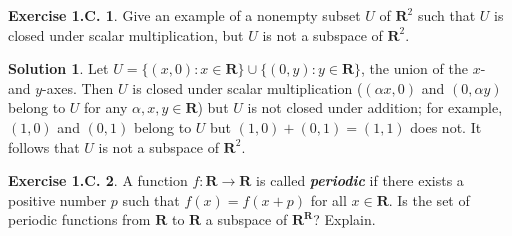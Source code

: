 \documentclass[12pt]{article}
\theoremstyle{definition}
\theoremstyle{exercise}
\newtheorem{exercise}{Exercise 1.C.}
\theoremstyle{solution}
\newtheorem*{solution}{Solution}
\newcommand{\R}{\mathbf{R}}
\begin{document}
\begin{exercise}
\label{ex:8}
    Give an example of a nonempty subset \( U \) of \( \R^2 \) such that \( U \) is closed under scalar multiplication, but \( U \) is not a subspace of \( \R^2 \).
\end{exercise}

\begin{solution}
    Let \( U = \{ (x, 0) : x \in \R \} \cup \{ (0, y) : y \in \R \} \), the union of the \( x \)- and \( y \)-axes. Then \( U \) is closed under scalar multiplication (\( (\alpha x, 0) \) and \( (0, \alpha y) \) belong to \( U \) for any \( \alpha, x, y \in \R \)) but \( U \) is not closed under addition; for example, \( (1, 0) \) and \( (0, 1) \) belong to \( U \) but \( (1, 0) + (0, 1) = (1, 1) \) does not. It follows that \( U \) is not a subspace of \( \R^2 \).
\end{solution}

\begin{exercise}
\label{ex:9}
    A function \( f : \R \to \R \) is called \textit{\textbf{periodic}} if there exists a positive number \( p \) such that \( f(x) = f(x + p) \) for all \( x \in \R \). Is the set of periodic functions from \( \R \) to \( \R \) a subspace of \( \R^{\R} \)? Explain.
\end{exercise}
\end{document}
